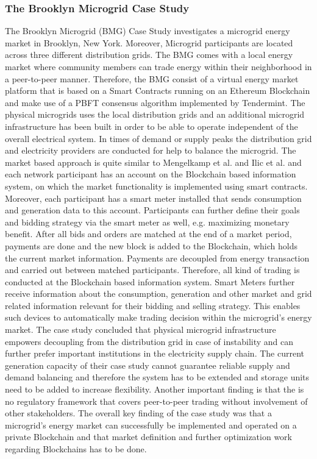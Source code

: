 \documentclass[runningheads]{llncs}
\begin{document}
\subsubsection{The Brooklyn Microgrid Case Study} 
The Brooklyn Microgrid (BMG) Case Study investigates a microgrid energy market in Brooklyn, New York. Moreover, Microgrid participants are located across three different distribution grids. The BMG comes with a local energy market where community members can trade energy within their neighborhood in a peer-to-peer manner. \newline
Therefore, the BMG consist of a virtual energy market platform that is based on a Smart Contracts running on an Ethereum Blockchain and make use of a PBFT consensus algorithm implemented by Tendermint. The physical microgrids uses the local distribution grids and an additional microgrid infrastructure has been built in order to be able to operate independent of the overall electrical system. In times of demand or supply peaks the distribution grid and electricity providers are conducted for help to balance the microgrid. \cite{brooklyn_microgrid} \newline
The market based approach is quite similar to Mengelkamp et al. \cite{mengelkamp_lem} and Ilic et al. \cite{ilic_smart_grid_neighbourhoods} and each network participant has an account on the Blockchain based information system, on which the market functionality is implemented using smart contracts. Moreover, each participant has a smart meter installed that sends consumption and generation data to this account. Participants can further define their goals and bidding strategy via the smart meter as well, e.g. maximizing monetary benefit. After all bids and orders are matched at the end of a market period, payments are done and the new block is added to the Blockchain, which holds the current market information. Payments are decoupled from energy transaction and carried out between matched participants. Therefore, all kind of trading is conducted at the Blockchain based information system. Smart Meters further receive information about the consumption, generation and other market and grid related information relevant for their bidding and selling strategy. This enables such devices to automatically make trading decision within the microgrid’s energy market. \newline
The case study \cite{brooklyn_microgrid} concluded that physical microgrid infrastructure empowers decoupling from the distribution grid in case of instability and can further prefer important institutions in the electricity supply chain. The current generation capacity of their case study cannot guarantee reliable supply and demand balancing and therefore the system has to be extended and storage units need to be added to increase flexibility. Another important finding is that the is no regulatory framework that covers peer-to-peer trading without involvement of other stakeholders. The overall key finding of the case study was that a microgrid’s energy market can successfully be implemented and operated on a private Blockchain and that market definition and further optimization work regarding Blockchains has to be done.
\end{document}
